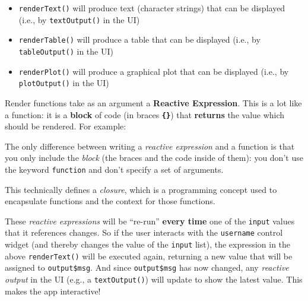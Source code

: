 \documentclass[]{book}
\newenvironment{Shaded}{\begin{snugshade}}{\end{snugshade}}
\newcommand{\KeywordTok}[1]{\textcolor[rgb]{0.13,0.29,0.53}{\textbf{#1}}}
\newcommand{\StringTok}[1]{\textcolor[rgb]{0.31,0.60,0.02}{#1}}
\newcommand{\CommentTok}[1]{\textcolor[rgb]{0.56,0.35,0.01}{\textit{#1}}}
\newcommand{\OperatorTok}[1]{\textcolor[rgb]{0.81,0.36,0.00}{\textbf{#1}}}
\newcommand{\NormalTok}[1]{#1}
\providecommand{\tightlist}{%
  \setlength{\itemsep}{0pt}\setlength{\parskip}{0pt}}
\theoremstyle{definition}
\theoremstyle{definition}
\theoremstyle{remark}
\begin{document}
\begin{itemize}
\tightlist
\item
  \texttt{renderText()} will produce text (character strings) that can
  be displayed (i.e., by \texttt{textOutput()} in the UI)
\item
  \texttt{renderTable()} will produce a table that can be displayed
  (i.e., by \texttt{tableOutput()} in the UI)
\item
  \texttt{renderPlot()} will produce a graphical plot that can be
  displayed (i.e., by \texttt{plotOutput()} in the UI)
\end{itemize}

Render functions take as an argument a \textbf{Reactive Expression}.
This is a lot like a function: it is a \textbf{block} of code (in braces
\textbf{\texttt{\{\}}}) that \textbf{returns} the value which should be
rendered. For example:

\begin{Shaded}
\end{Shaded}

The only difference between writing a \emph{reactive expression} and a
function is that you only include the \emph{block} (the braces and the
code inside of them): you don't use the keyword \texttt{function} and
don't specify a set of arguments.

This technically defines a \emph{closure}, which is a programming
concept used to encapsulate functions and the context for those
functions.

These \emph{reactive expressions} will be ``re-run'' \textbf{every time}
one of the \texttt{input} values that it references changes. So if the
user interacts with the \texttt{username} control widget (and thereby
changes the value of the \texttt{input} list), the expression in the
above \texttt{renderText()} will be executed again, returning a new
value that will be assigned to \texttt{output\$msg}. And since
\texttt{output\$msg} has now changed, any \emph{reactive output} in the
UI (e.g., a \texttt{textOutput()}) will update to show the latest value.
This makes the app interactive!
\end{document}
